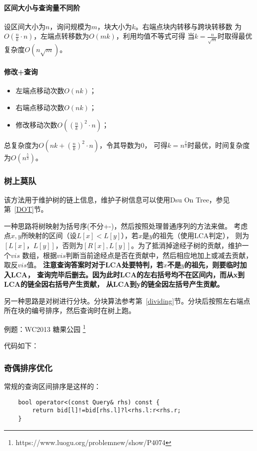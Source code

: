 \paragraph{区间大小与查询量不同阶}
设区间大小为$n$，询问规模为$m$，块大小为$k$。右端点块内转移与跨块转移数
为$O(\frac{n}{k}\cdot n)$，左端点转移数为$O(mk)$，利用均值不等式可得
当$k=\frac{n}{\sqrt{m}}$时取得最优复杂度$O(n\sqrt{m})$。
\paragraph{修改+查询}
\begin{itemize}
	\item 左端点移动次数$O(nk)$；
	\item 右端点移动次数$O(nk)$；
	\item 修改移动次数$O(\left(\frac{n}{k}\right)^2\cdot n)$；
\end{itemize}
总复杂度为$O(nk+\left(\frac{n}{k}\right)^2\cdot n)$，令其导数为0，
可得$k=n^\frac{2}{3}$时最优，时间复杂度为$O(n^\frac{5}{3})$。
\subsubsection{树上莫队}
该方法用于维护树的链上信息，维护子树信息可以使用Dsu On Tree，参见第~\ref{DOT}节。

一种思路将树映射为括号序(不分+-)，然后按照处理普通序列的方法来做。
考虑点$x,y$所映射的区间（设$L[x]<L[y]$），若$x$是$y$的祖先（使用LCA判定），
则为$[L[x]，L[y]]$，否则为$[R[x],L[y]]$。为了抵消掉途经子树的贡献，维护一个$vis$
数组，根据$vis$判断当前途经点是否在贡献中，然后相应地加上或减去贡献，取反$vis$值。
{\bfseries 注意查询答案时对于LCA处要特判，若$x$不是$y$的祖先，则要临时加入LCA，
查询完毕后删去。因为此时LCA的左右括号均不在区间内，而从x到LCA的链全因右括号产生贡献，
从LCA到y的链全因左括号产生贡献。}

另一种思路是对树进行分块。分块算法参考第~\ref{dividing}节。分块后按照左右端点
所在块的编号排序，然后查询时在树上跑。

例题：WC2013 糖果公园
\footnote{https://www.luogu.org/problemnew/show/P4074}

代码如下：

\subsubsection{奇偶排序优化}
常规的查询区间排序是这样的：
\begin{lstlisting}
    bool operator<(const Query& rhs) const {
        return bid[l]!=bid[rhs.l]?l<rhs.l:r<rhs.r;
    }
\end{lstlisting}

